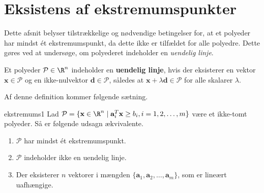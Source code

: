 \section{Eksistens af ekstremumspunkter}
%
Dette afsnit belyser tilstrækkelige og nødvendige betingelser for, at et polyeder har mindst ét ekstremumspunkt, da dette ikke er tilfældet for alle polyedre. 
Dette gøres ved at undersøge, om polyederet indeholder en \textit{uendelig linje}.
%
\begin{defn}{}{}
Et polyeder $\mathcal{P} \in \R^n$ indeholder en \textbf{uendelig linje}, hvis der eksisterer en vektor $\textbf{x} \in \mathcal{P}$ og en ikke-nulvektor $\textbf{d} \in \mathcal{P}$, således at $\textbf{x} + \lambda \textbf{d} \in \mathcal{P}$ for alle skalarer $\lambda$.
\end{defn}
\noindent
%
Af denne definition kommer følgende sætning.
%
\begin{thm}{}{ekstremums1}
Lad $\mathcal{P} = \{\textbf{x} \in \R^n \mid \textbf{a}_i^T\textbf{x} \geq b_i, i = 1,2,\ldots,m  \}$ være et ikke-tomt polyeder.
Så er følgende udsagn ækvivalente.
%
\begin{enumerate}[label = (\alph*)]
\item $\mathcal{P}$ har mindst ét ekstremumspunkt.
\item $\mathcal{P}$ indeholder ikke en uendelig linje.
\item Der eksisterer $n$ vektorer i mængden $\{\mathbf{a}_1, \mathbf{a}_2, \ldots , \mathbf{a}_m \}$, som er lineært uafhængige.
\end{enumerate}
\end{thm}
%
